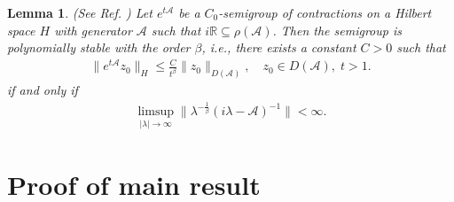 \documentclass[twoside]{article}
\newtheorem{lemma}[definition]{Lemma}
\theoremstyle{noparens}
\theoremstyle{definition}
\numberwithin{equation}{section}
\numberwithin{figure}{section}
\begin{document}
\begin{lemma}\label{lemma:methods} (See Ref. \cite{BorTom,LiuRao05,RSS})
	Let $e^{t\mathcal{A}}$ be a $C_0$-semigroup of contractions on a Hilbert space $H$ with
	generator $\mathcal{A}$ such that $i\mathbb{R}\subseteq \rho(\mathcal{A})$. Then
	the semigroup is polynomially stable with the order ${\beta}$, i.e.,  there exists a constant $C>0$ such that
	\begin{align}
		\|e^{t\mathcal{A}}z_0\|_{H} \leq \frac{C}{t^{\beta}} \|z_0\|_{D(\mathcal{A})},
		\quad   z_0 \in D(\mathcal{A}), \;  t>1.
	\end{align}
	if and only if
	\begin{align}
		\label{huang}
		\limsup\limits_{|\lambda|\rightarrow\infty}\|\lambda^{-\frac{1}\beta}(i\lambda-\mathcal{A})^{-1}\| < \infty.
	\end{align}
\end{lemma}

\section{Proof of main result}
\end{document}
